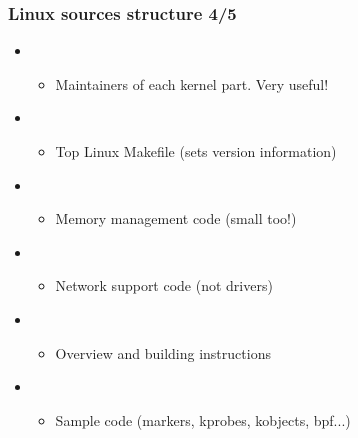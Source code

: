 \begin{frame}
  \frametitle{Linux sources structure 4/5}
  \begin{itemize}
  \item {}
    \begin{itemize}
    \item Maintainers of each kernel part. Very useful!
    \end{itemize}
  \item {}
    \begin{itemize}
    \item Top Linux Makefile (sets version information)
    \end{itemize}
  \item {}
    \begin{itemize}
    \item Memory management code (small too!)
    \end{itemize}
  \item {}
    \begin{itemize}
    \item Network support code (not drivers)
    \end{itemize}
  \item {}
    \begin{itemize}
    \item Overview and building instructions
    \end{itemize}
  \item {}
    \begin{itemize}
    \item Sample code (markers, kprobes, kobjects, bpf...)
    \end{itemize}
  \end{itemize}
\end{frame}

